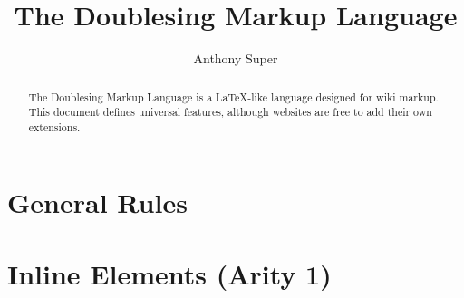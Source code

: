 \documentclass{article}
\begin{document}
\title{The Doublesing Markup Language}
\author{Anthony Super}
\maketitle
\begin{abstract}
The Doublesing Markup Language is a \LaTeX-like language designed for wiki markup.
This document defines universal features, although websites are free to add their own extensions.
\end{abstract}
\section{General Rules}

\section{Inline Elements (Arity 1)}


\end{document}
